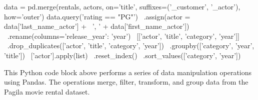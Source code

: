 \begin{samepage}
\begin{pythoncode}
data = pd.merge(rentals, actors, on='title', 
         suffixes=('_customer', '_actor'), how='outer')
data.query('rating == "PG"') \
    .assign(actor = data['last_name_actor'] + \
                   ', ' + data['first_name_actor']) \
    .rename(columns={'release_year': 'year'}) \
    [['actor', 'title', 'category', 'year']] \
    .drop_duplicates(['actor', 'title', 'category', 'year']) \
    .groupby(['category', 'year', 'title']) \
    ['actor'].apply(list) \
    .reset_index() \
    .sort_values(['category', 'year']) \
\end{pythoncode}
\end{samepage}

This Python code block above performs a series of data manipulation operations using Pandas. The operations merge, filter, transform, and group data from the Pagila movie rental dataset.

